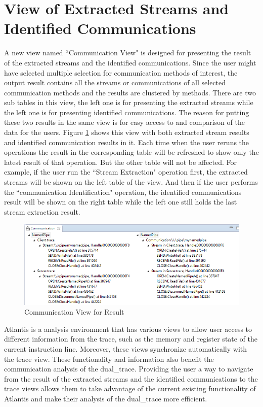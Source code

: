 \section{View of Extracted Streams and Identified Communications}
A new view named ``Communication View" is designed for presenting the result of the extracted streams and the identified communications. Since the user might have selected multiple selection for communication methods of interest, the output result contains all the streams or communications of all selected communication methods and the results are clustered by methods. There are two sub tables in this view, the left one is for presenting the extracted streams while the left one is for presenting identified communications. The reason for putting these two results in the same view is for easy access to and comparison of the data for the users. Figure \ref{idenview} shows this view with both extracted stream results and identified communication results in it. Each time when the user reruns the operations the result in the corresponding table will be refreshed to show only the latest result of that operation. But the other table will not be affected. For example, if the user run the ``Stream Extraction" operation first, the extracted streams will be shown on the left table of the view. And then if the user performs the ``communication Identification" operation, the identified communications result will be shown on the right table while the left one still holds the last stream extraction result.

\begin{figure}[H]
\centerline{\includegraphics[scale=0.7]{Figures/idenview}}
 \caption{Communication View for Result}
\label{idenview}
\end{figure}

Atlantis is a analysis environment that has various views to allow user access to different information from the trace, such as the memory and register state of the current instruction line. Moreover, these views synchronize automatically with the trace view. These functionality and information also benefit the communication analysis of the dual\_trace. Providing the user a way to navigate from the result of the extracted streams and the identified communications to the trace views allows them to take advantage of the current existing functionality of Atlantis and make their analysis of the dual\_trace more efficient.

